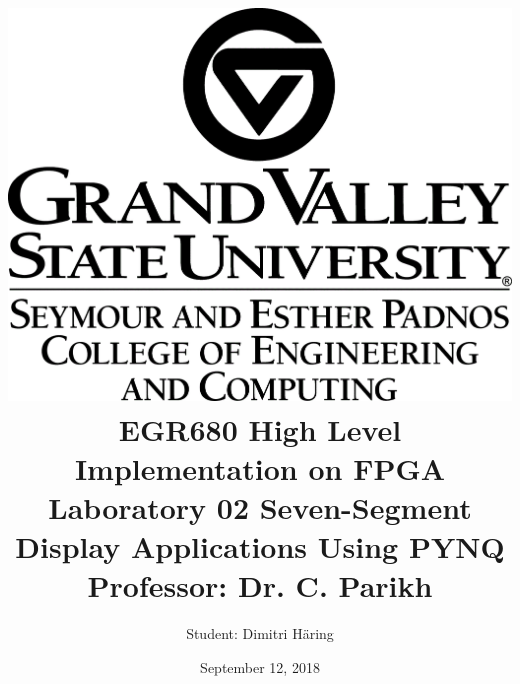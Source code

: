\documentclass[]{article}
\title{ \includegraphics[scale=0.2]{01_images/gvsu_logo_marktop_SEPCEC_K_R.png}
		\linebreak 	\linebreak \linebreak
		EGR680 High Level Implementation on FPGA
		\linebreak \linebreak 
		Laboratory 02
		\linebreak \linebreak 
		Seven-Segment Display Applications Using PYNQ
		\linebreak \linebreak \linebreak
		Professor: Dr. C. Parikh
		}
\author{Student: Dimitri Häring } %
\date{September 12, 2018}
\begin{document}
\maketitle
\newpage

\tableofcontents
\pagebreak



 

\printbibliography
\end{document}
